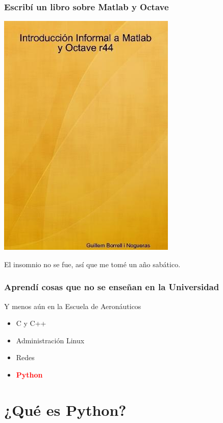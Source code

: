 \documentclass[12pt,mathserif,compress]{beamer}
\begin{document}
\begin{frame}
  \frametitle{Escribí un libro sobre Matlab y Octave}
  \begin{center}
  \includegraphics[height=0.6\textheight]{files/portada.jpg}    
  \end{center}
\end{frame}

\begin{frame}
  \begin{center}
    El insomnio no se fue, así que me tomé un año sabático.
  \end{center}
\end{frame}

\begin{frame}
  \frametitle{Aprendí cosas que no se enseñan en la Universidad}
Y menos aún en la Escuela de Aeronáuticos
\begin{itemize}
\item C y C++
\pause
\item Administración Linux
\pause
\item Redes
\pause
\item \textcolor{red}{\textbf{Python}}
\end{itemize}
\end{frame}

\section{¿Qué es Python?}
\end{document}
